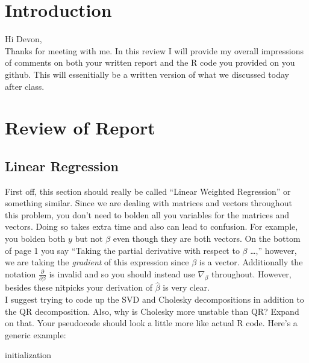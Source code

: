 \documentclass[11pt]{article}
\begin{document}
\maketitle

\setlength{\parindent}{0cm}

\section{Introduction}
Hi Devon, \\

Thanks for meeting with me. In this review I will provide my overall impressions of comments on both your written report and the R code you provided on you github. This will essenitially be a written version of what we discussed today after class.

\section{Review of Report}

\subsection{Linear Regression}

First off, this section should really be called ``Linear Weighted Regression'' or something similar. Since we are dealing with matrices and vectors throughout this problem, you don't need to bolden all you variables for the matrices and vectors. Doing so takes extra time and also can lead to confusion. For example, you bolden both $y$ but not $\beta$ even though they are both vectors. On the bottom of page 1 you say ``Taking the partial derivative with respect to $\beta$ \ldots,'' however, we are taking the \emph{gradient} of this expression since $\beta$ is a vector. Additionally the notation $\frac{\partial}{\partial \beta}$ is invalid and so you should instead use $\nabla_\beta$ throughout. However, besides these nitpicks your derivation of $\hat{\beta}$ is very clear. \\

I suggest trying to code up the SVD and Cholesky decompositions in addition to the QR decomposition. Also, why is Cholesky more unstable than QR? Expand on that. Your pseudocode should look a little more like actual R code. Here's a generic example: \\

\begin{algorithm}[H]
 initialization\;
\end{algorithm}
\end{document}
